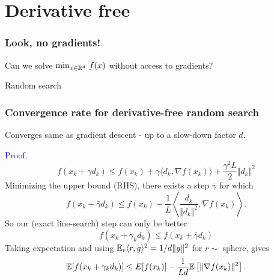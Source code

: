 \documentclass[aspectratio=149]{beamer}
\begin{document}
\section{Derivative free}%
\label{sec:}

\begin{frame}
  \frametitle{Look, no gradients!}
  Can we solve $\min_{x\in \mathbb{R}^d}\, f(x)$ without access to gradients?

  \begin{algorithm}[H]
    \caption{Random search}
    \begin{algorithmic}[1]
      \EndFor{}
    \end{algorithmic}
  \end{algorithm}

\end{frame}

\begin{frame}
  \frametitle{Convergence rate for derivative-free random search}
  Converges same as gradient descent - up to a slow-down factor $d$.

  \textcolor{blue}{Proof.}
  \begin{equation}
    f(x_k+ \gamma d_k ) \le f(x_k) + \gamma \langle d_k, \nabla f(x_k) \rangle + \frac{\gamma^2L}{2} \Vert d_k \Vert^2
  \end{equation}
  Minimizing the upper bound (RHS), there exists a step $\bar{\gamma}$ for which
  \begin{equation}
    f(x_k + \bar{\gamma}d_k) \le f(x_k) - \frac{1}{L} \left\langle \frac{d_k}{\Vert d_k \Vert^2}, \nabla f(x_k)\right\rangle.
  \end{equation}
  So our (exact line-search) step can only be better
  \begin{equation}
    f(x_k + \gamma_k d_k) \le f(x_k + \bar{\gamma}d_k)
  \end{equation}
  Taking expectation and using $\mathbb{E}_r \langle r, g \rangle^2 = 1/d \Vert g \Vert^2$ for $r \sim$ sphere, gives
  \begin{equation}
    \mathbb{E} [f(x_k+ \gamma_k d_k)] \le E[f(x_k)] - \frac{1}{L d} \mathbb{E}\left[ \Vert \nabla f(x_k) \Vert^2\right].
  \end{equation}

\end{frame}
\end{document}
